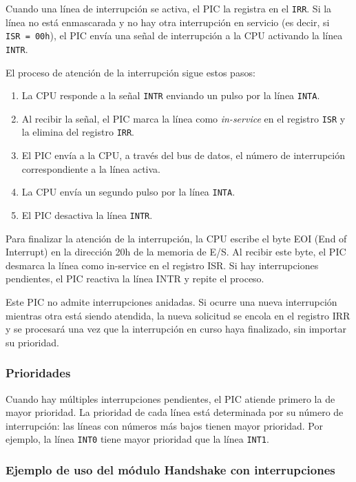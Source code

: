 \documentclass[12pt,oneside]{templates/unerthesis}
\providecommand{\tightlist}{%
  \setlength{\itemsep}{0pt}\setlength{\parskip}{0pt}}
\begin{document}
Cuando una línea de interrupción se activa, el PIC la registra en el \texttt{IRR}. Si la línea no está enmascarada y no hay otra interrupción en servicio (es decir, si \texttt{ISR\ =\ 00h}), el PIC envía una señal de interrupción a la CPU activando la línea \texttt{INTR}.

El proceso de atención de la interrupción sigue estos pasos:

\begin{enumerate}
\def\labelenumi{\arabic{enumi}.}
\tightlist
\item
  La CPU responde a la señal \texttt{INTR} enviando un pulso por la línea \texttt{INTA}.
\item
  Al recibir la señal, el PIC marca la línea como \emph{in-service} en el registro \texttt{ISR} y la elimina del registro \texttt{IRR}.
\item
  El PIC envía a la CPU, a través del bus de datos, el número de interrupción correspondiente a la línea activa.
\item
  La CPU envía un segundo pulso por la línea \texttt{INTA}.
\item
  El PIC desactiva la línea \texttt{INTR}.
\end{enumerate}

Para finalizar la atención de la interrupción, la CPU escribe el byte EOI (End of Interrupt) en la dirección 20h de la memoria de E/S. Al recibir este byte, el PIC desmarca la línea como in-service en el registro ISR. Si hay interrupciones pendientes, el PIC reactiva la línea INTR y repite el proceso.

Este PIC no admite interrupciones anidadas. Si ocurre una nueva interrupción mientras otra está siendo atendida, la nueva solicitud se encola en el registro IRR y se procesará una vez que la interrupción en curso haya finalizado, sin importar su prioridad.

\hypertarget{prioridades}{%
\subsubsection{Prioridades}\label{prioridades}}

Cuando hay múltiples interrupciones pendientes, el PIC atiende primero la de mayor prioridad. La prioridad de cada línea está determinada por su número de interrupción: las líneas con números más bajos tienen mayor prioridad. Por ejemplo, la línea \texttt{INT0} tiene mayor prioridad que la línea \texttt{INT1}.

\hypertarget{ejemplo-de-uso-del-muxf3dulo-handshake-con-interrupciones}{%
\subsubsection{Ejemplo de uso del módulo Handshake con interrupciones}\label{ejemplo-de-uso-del-muxf3dulo-handshake-con-interrupciones}}
\end{document}
